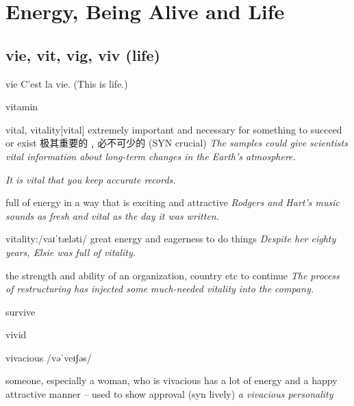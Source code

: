 \chapter{Energy, Being Alive and Life}

\section{vie, vit, vig, viv (life)}

\begin{DefWord}{vie}
    C'est la vie. (This is life.)
\end{DefWord}

\begin{DefWord}{vitamin}
\end{DefWord}

\begin{DefWord}{vital, vitality}[vital]
    extremely important and necessary for something to succeed or exist 极其重要的﹐必不可少的 (SYN  crucial)
    \textit{The samples could give scientists vital information about long-term changes in the Earth’s atmosphere.}

    \textit{It is vital that you keep accurate records.}

    full of energy in a way that is exciting and attractive
    \textit{Rodgers and Hart’s music sounds as fresh and vital as the day it was written.}

    vitality:/vaɪˈtæləti/
    great energy and eagerness to do things
    \textit{Despite her eighty years, Elsie was full of vitality.}

    the strength and ability of an organization, country etc to continue
    \textit{The process of restructuring has injected some much-needed vitality into the company.}
\end{DefWord}

\begin{DefWord}{survive}
\end{DefWord}

\begin{DefWord}{vivid}
\end{DefWord}

\begin{DefWord}{vivacious}
    /vəˈveɪʃəs/

    someone, especially a woman, who is vivacious has a lot of energy and a happy attractive manner – used to show approval (syn lively)
    \textit{a vivacious personality}
\end{DefWord}

